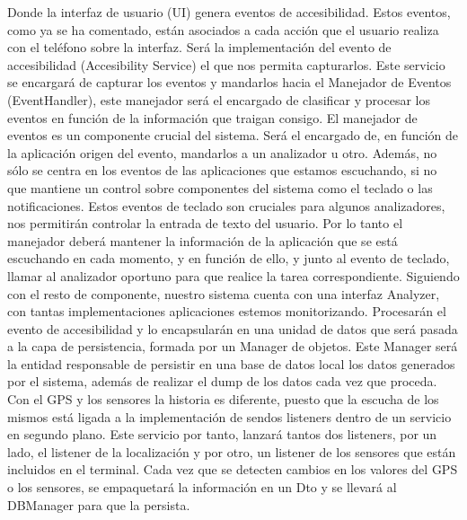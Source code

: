 \documentclass[12pt,a4paper,oneside]{book} %
\begin{document}
Donde la interfaz de usuario (UI) genera eventos de accesibilidad. Estos eventos, como ya se ha comentado, están asociados a cada acción que el usuario realiza con el teléfono sobre la interfaz. Será la implementación del evento de accesibilidad (Accesibility Service) el que nos permita capturarlos. 
\newline
\newline
Este servicio se encargará de capturar los eventos y mandarlos hacia el Manejador de Eventos (EventHandler), este manejador será el encargado de clasificar y procesar los eventos en función de la información que traigan consigo. 
\newline
\newline
El manejador de eventos es un componente crucial del sistema. Será el encargado de, en función de la aplicación origen del evento, mandarlos a un analizador u otro. Además, no sólo se centra en los eventos de las aplicaciones que estamos escuchando, si no que mantiene un control sobre componentes del sistema como el teclado o las notificaciones. 
\newline 
\newline 
Estos eventos de teclado son cruciales para algunos analizadores, nos permitirán controlar la entrada de texto del usuario. Por lo tanto el manejador deberá mantener la información de la aplicación que se está escuchando en cada momento, y en función de ello, y junto al evento de teclado, llamar al analizador oportuno para que realice la tarea correspondiente. 
\newline
\newline
Siguiendo con el resto de componente, nuestro sistema cuenta con una interfaz Analyzer, con tantas implementaciones 
 aplicaciones estemos monitorizando. Procesarán el evento de accesibilidad y lo encapsularán en una unidad de datos que será pasada a la capa de persistencia, formada por un Manager de objetos. Este Manager será la entidad responsable de persistir en una base de datos local los datos generados por el sistema, además de realizar el dump de los datos cada vez que proceda. 
\newline
\newline
Con el GPS y los sensores la historia es diferente, puesto que la escucha de los mismos está ligada a la implementación de sendos listeners dentro de un servicio en segundo plano. Este servicio por tanto, lanzará tantos dos listeners, por un lado, el listener de la localización y por otro, un listener de los sensores que están incluidos en el terminal. Cada vez que se detecten cambios en los valores del GPS o los sensores, se empaquetará la información en un Dto y se llevará al DBManager para que la persista.
\end{document}

